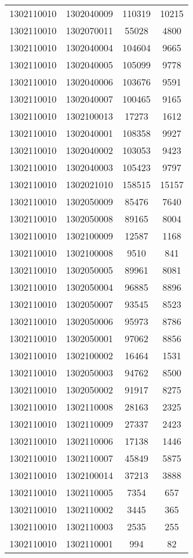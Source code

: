 \begin{longtable}[h]{llcc}
		1302110010 & 1302040009 & 110319 & 10215\\
		1302110010 & 1302070011 & 55028 & 4800\\
		1302110010 & 1302040004 & 104604 & 9665\\
		1302110010 & 1302040005 & 105099 & 9778\\
		1302110010 & 1302040006 & 103676 & 9591\\
		1302110010 & 1302040007 & 100465 & 9165\\
		1302110010 & 1302100013 & 17273 & 1612\\
		1302110010 & 1302040001 & 108358 & 9927\\
		1302110010 & 1302040002 & 103053 & 9423\\
		1302110010 & 1302040003 & 105423 & 9797\\
		1302110010 & 1302021010 & 158515 & 15157\\
		1302110010 & 1302050009 & 85476 & 7640\\
		1302110010 & 1302050008 & 89165 & 8004\\
		1302110010 & 1302100009 & 12587 & 1168\\
		1302110010 & 1302100008 & 9510 & 841\\
		1302110010 & 1302050005 & 89961 & 8081\\
		1302110010 & 1302050004 & 96885 & 8896\\
		1302110010 & 1302050007 & 93545 & 8523\\
		1302110010 & 1302050006 & 95973 & 8786\\
		1302110010 & 1302050001 & 97062 & 8856\\
		1302110010 & 1302100002 & 16464 & 1531\\
		1302110010 & 1302050003 & 94762 & 8500\\
		1302110010 & 1302050002 & 91917 & 8275\\
		1302110010 & 1302110008 & 28163 & 2325\\
		1302110010 & 1302110009 & 27337 & 2423\\
		1302110010 & 1302110006 & 17138 & 1446\\
		1302110010 & 1302110007 & 45849 & 5875\\
		1302110010 & 1302100014 & 37213 & 3888\\
		1302110010 & 1302110005 & 7354 & 657\\
		1302110010 & 1302110002 & 3445 & 365\\
		1302110010 & 1302110003 & 2535 & 255\\
		1302110010 & 1302110001 & 994 & 82\\

\end{longtable}

